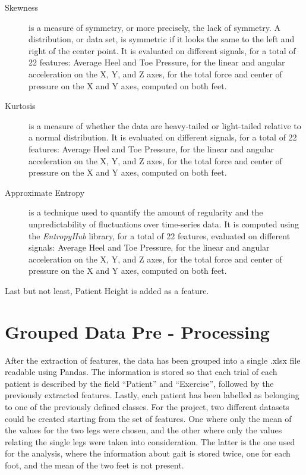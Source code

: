 \begin{description}
\item[Skewness] is a measure of symmetry, or more precisely, the lack of symmetry. A distribution, or data set, is symmetric if it looks the same to the left and right of the center point. It is evaluated on different signals, for a total of 22 features:
Average Heel and Toe Pressure, for the linear and angular acceleration on the X, Y, and Z axes, for the total force and center of pressure on the X and Y axes, computed on both feet.

\item[Kurtosis]  is a measure of whether the data are heavy-tailed or light-tailed relative to a normal distribution. It is evaluated on different signals, for a total of 22 features:
Average Heel and Toe Pressure, for the linear and angular acceleration on the X, Y, and Z axes, for the total force and center of pressure on the X and Y axes, computed on both feet.

\item[Approximate Entropy]  is a technique used to quantify the amount of regularity and the unpredictability of fluctuations over time-series data. It is computed using the \textit{EntropyHub} library, for a total of 22 features, evaluated on different signals:
Average Heel and Toe Pressure, for the linear and angular acceleration on the X, Y, and Z axes, for the total force and center of pressure on the X and Y axes, computed on both feet.
 
\end{description}

Last but not least, Patient Height is added as a feature.

\section{Grouped Data Pre - Processing}
After the extraction of features, the data has been grouped into a single .xlsx file readable using Pandas. The information is stored
so that each trial of each patient is described by the field \enquote{Patient} and \enquote{Exercise}, followed by the previously extracted features.
Lastly, each patient has been labelled as belonging to one of the previously defined classes. For the project, two different datasets could be created starting from the set of features. One where only the mean of the values for the two legs were chosen, and the other where only the values relating the single legs were taken into consideration. The latter is the one used for the analysis, where the information about gait is stored twice, one for each foot, and the mean of the two feet is not present.

